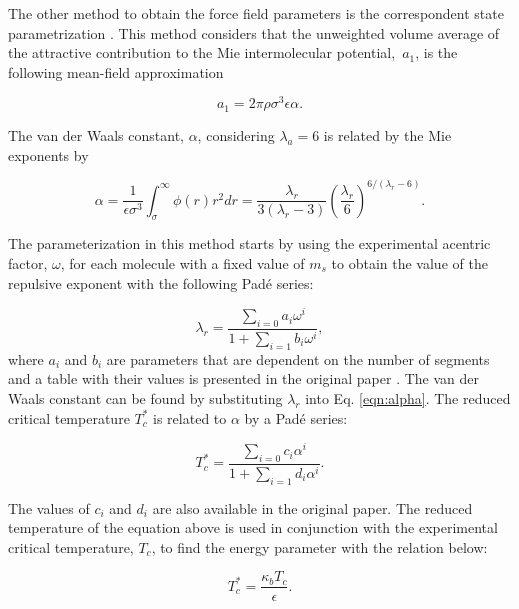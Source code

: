     The other method to obtain the force field parameters is the correspondent state parametrization \cite{mejia2014}. This method considers that the unweighted volume average of the attractive contribution to the Mie intermolecular potential, $ \, a_{1}$, is the following mean-field approximation
    
    \begin{equation}
    a_{1} = 2\pi\rho\sigma^{3}\epsilon\alpha .
    \label{eqn:a1corres}
    \end{equation}
    
    The van der Waals constant, $\alpha$, considering $ \lambda_{a} = 6$ is related by the Mie exponents by
    
    \begin{equation}
    \alpha = \frac{1}{\epsilon\sigma^{3    }} \int_{\sigma}^{\infty} \phi(r)r^{2}dr = \frac{\lambda_{r}}{3(\lambda_{r}-3)}\left(\frac{\lambda_r}{6}\right)^{6/(\lambda_{r} - 6)}  .
    \label{eqn:alpha}
    \end{equation}
    
    The parameterization in this method starts by using the experimental acentric factor, $\omega$, for each molecule with a fixed value of $ m_{s}$ to obtain the value of the repulsive exponent with the following Padé series:
    
    \begin{equation}
    \lambda_{r} = \frac{\sum_{i=0} a_{i}\omega^{i}}{1+\sum_{i=1} b_{i}\omega^{i}} ,  
    \label{eqn:lambdaco}
    \end{equation}
    where $a_{i}$ and $b_{i}$ are parameters that are dependent on the number of segments and a table with their values is presented in the original paper \cite{mejia2014}. The van der Waals constant can be found by substituting $\lambda_{r}$ into Eq. \eqref{eqn:alpha}. The reduced critical temperature $T_{c}^{*}$ is related to $\alpha$ by a Padé series: 
    
    \begin{equation}
    T_{c}^{*} = \frac{\sum_{i=0} c_{i}\alpha^{i}}{1+\sum_{i=1} d_{i}\alpha^{i}}   .
    \label{eqn:tc}
    \end{equation}
    
    The values of $c_{i}$ and $d_{i}$ are also available in the original paper. The reduced temperature of the equation above is used in conjunction with the experimental critical temperature, $ T_{c}$, to find the energy parameter with the relation below:
    
    \begin{equation}
    T_{c}^{*} = \frac{\kappa_{b}T_{c}}{\epsilon}   .
    \label{eqn:epscorre}
    \end{equation}
    
